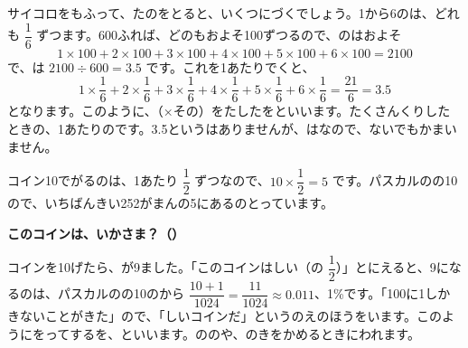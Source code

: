\leavevmode\label{bk:3-17:kitaichi}サイコロをもふって、たのをとると、いくつにづくでしょう。1から6のは、どれも $\dfrac{1}{6}$ ずつます。600ふれば、どのもおよそ100ずつるので、のはおよそ
\[ 1\times100+2\times100+3\times100+4\times100+5\times100+6\times100=2100 \]
で、は $2100\div600=3.5$ です。これを1あたりでくと、
\[ 1\times\frac{1}{6}+2\times\frac{1}{6}+3\times\frac{1}{6}+4\times\frac{1}{6}+5\times\frac{1}{6}+6\times\frac{1}{6}=\frac{21}{6}=3.5 \]
となります。このように、（×その）をたしたを\textbf{}といいます。たくさんくりしたときの、1あたりのです。3.5というはありませんが、はなので、ないでもかまいません。

コイン10でがるのは、1あたり $\dfrac{1}{2}$ ずつなので、$10\times\dfrac{1}{2}=5$ です。パスカルのの10ので、いちばんきい252がまんの5にあるのとっています。

\noindent\begin{minipage}{\linewidth}\begin{motto}[3]
\textbf{このコインは、いかさま？（）}\par
コインを10げたら、が9ました。「このコインはしい（の $\dfrac{1}{2}$）」とにえると、9になるのは、パスカルのの10のから $\dfrac{10+1}{1024}=\dfrac{11}{1024}\approx0.011$、1\%です。「100に1しかきないことがきた」ので、「しいコインだ」というのえのほうをいます。このようにをってするを、\textbf{}といいます。ののや、のきをかめるときにわれます。
\end{motto}
\end{minipage}

